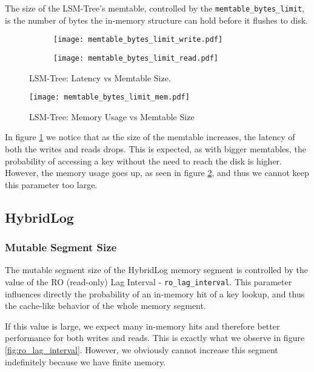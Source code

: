The size of the LSM-Tree's memtable, controlled by the \verb"memtable_bytes_limit", is the number of bytes the in-memory structure can hold before it flushes to disk.

\begin{figure}[h]
    \begin{subfigure}{.5\textwidth}
        \centering
        \texttt{[image: memtable\_bytes\_limit\_write.pdf]}
    \end{subfigure}
    \begin{subfigure}{.5\textwidth}
        \centering
        \texttt{[image: memtable\_bytes\_limit\_read.pdf]}
    \end{subfigure}
    \caption{LSM-Tree: Latency vs Memtable Size.}
    \label{fig:memtable-bytes-limit-write-read}
\end{figure}

\begin{figure}[h]
    \centering
    \texttt{[image: memtable\_bytes\_limit\_mem.pdf]}
    \caption{LSM-Tree: Memory Usage vs Memtable Size}
    \label{fig:memtable_bytes_limit_mem}
\end{figure}

In figure \ref{fig:memtable-bytes-limit-write-read} we notice that as the size of the memtable increases, the latency of both the writes and reads drops. This is expected, as with bigger memtables, the probability of accessing a key without the need to reach the disk is higher. However, the memory usage goes up, as seen in figure \ref{fig:memtable_bytes_limit_mem}, and thus we cannot keep this parameter too large.

\subsection{HybridLog}

\subsubsection{Mutable Segment Size}

The mutable segment size of the HybridLog memory segment is controlled by the value of the RO (read-only) Lag Interval - \verb"ro_lag_interval". This parameter influences directly the probability of an in-memory hit of a key lookup, and thus the cache-like behavior of the whole memory segment.

If this value is large, we expect many in-memory hits and therefore better performance for both writes and reads. This is exactly what we observe in figure \ref{fig:ro_lag_interval}. However, we obviously cannot increase this segment indefinitely because we have finite memory.


